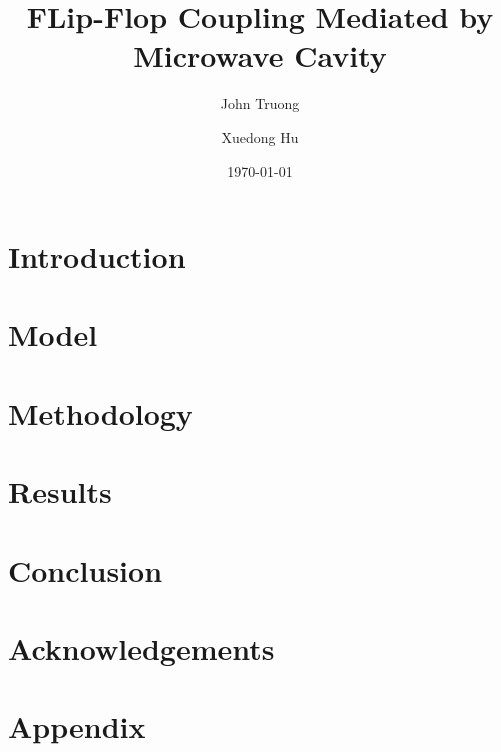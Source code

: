 \documentclass[
    reprint,
    amsmath,amssymb,
    aps,
    prb,
    floatfix,
]{revtex4-2}
\begin{document}
\title{FLip-Flop Coupling Mediated by Microwave Cavity}

\author{John Truong}
\author{Xuedong Hu}%

\date{\today}

\begin{abstract}
    \lipsum[1]
\end{abstract}

\maketitle

\section{Introduction}
    \lipsum[2-4]
\section{Model}
    \lipsum[5-7]
\section{Methodology}
    \lipsum[8-12]
\section{Results}
    \lipsum[13-15]
\section{Conclusion}
    \lipsum[16-17]
\section*{Acknowledgements}
    \lipsum[18]

\newpage
\appendix

\section{Appendix}
    \lipsum[19-20]
\end{document}

